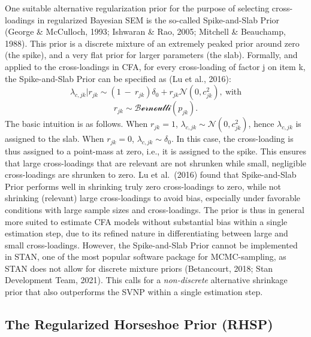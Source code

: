 \documentclass[
  man, donotrepeattitle,floatsintext]{apa6}
\begin{document}
One suitable alternative regularization prior for the purpose of selecting cross-loadings in
regularized Bayesian SEM is the so-called Spike-and-Slab Prior (George \& McCulloch, 1993; Ishwaran \& Rao, 2005; Mitchell \& Beauchamp, 1988). This prior is a discrete mixture of an extremely peaked prior around zero (the spike), and a very flat prior for larger parameters (the slab). Formally, and applied to the cross-loadings in CFA, for every cross-loading of factor j
on item k, the Spike-and-Slab Prior can be specified as (Lu et al., 2016):
\[\lambda_{c,jk} |r_{jk} \sim (1 \ - \ r_{jk})\delta_0 + r_{jk} \mathcal{N}(0, c^2_{jk}) , \ \text{with}\]
\[r_{jk} \sim \mathcal{Bernoulli}(p_{jk}).\]
The basic intuition is as follows. When \(r_{jk} = 1\), \(\lambda_{c,jk} \sim \mathcal{N}(0, c^2_{jk})\), hence \(\lambda_{c,jk}\) is assigned to the slab. When \(r_{jk} = 0\), \(\lambda_{c,jk} \sim \delta_0\). In this case, the cross-loading is thus assigned to a point-mass at zero, i.e., it is assigned to the spike. This ensures that large cross-loadings that are relevant are not shrunken while small, negligible cross-loadings are shrunken to zero. Lu et al.~(2016) found that Spike-and-Slab Prior performs well in shrinking truly zero cross-loadings to zero, while not shrinking (relevant) large cross-loadings to avoid bias, especially under favorable conditions with large sample sizes and cross-loadings. The prior is thus in general more suited to estimate CFA models without substantial bias within a single estimation step, due to its refined nature in differentiating between large and small cross-loadings. However, the Spike-and-Slab Prior cannot be implemented in STAN, one of the most popular software package for MCMC-sampling, as STAN does not allow for discrete mixture priors (Betancourt, 2018; Stan Development Team, 2021). This calls for a \emph{non-discrete} alternative shrinkage prior that also outperforms the SVNP within a single estimation step.

\hypertarget{the-regularized-horseshoe-prior-rhsp}{%
\subsection{The Regularized Horseshoe Prior (RHSP)}\label{the-regularized-horseshoe-prior-rhsp}}
\end{document}
